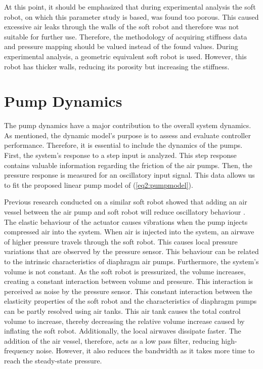 At this point, it should be emphasized that during experimental analysis the soft robot, on which this parameter study is based, was found too porous. This caused excessive air leaks through the walls of the soft robot and therefore was not suitable for further use. Therefore, the methodology of acquiring stiffness data and pressure mapping should be valued instead of the found values. During experimental analysis, a geometric equivalent soft robot is used. However, this robot has thicker walls, reducing its porosity but increasing the stiffness. 




\section{Pump Dynamics}



The pump dynamics have a major contribution to the overall system dynamics. As mentioned, the dynamic model's purpose is to assess and evaluate controller performance. Therefore, it is essential to include the dynamics of the pumps. First, the system's response to a step input is analyzed. This step response contains valuable information regarding the friction of the air pumps. Then, the pressure response is measured for an oscillatory input signal. This data allows us to fit the proposed linear pump model of (\ref{eq2:pumpmodel}).


Previous research conducted on a similar soft robot showed that adding an air vessel between the air pump and soft robot will reduce oscillatory behaviour \cite{proper}. The elastic behaviour of the actuator causes vibrations when the pump injects compressed air into the system. When air is injected into the system, an airwave of higher pressure travels through the soft robot. This causes local pressure variations that are observed by the pressure sensor. This behaviour can be related to the intrinsic characteristics of diaphragm air pumps. Furthermore, the system's volume is not constant. As the soft robot is pressurized, the volume increases, creating a constant interaction between volume and pressure. This interaction is perceived as noise by the pressure sensor. This constant interaction between the elasticity properties of the soft robot and the characteristics of diaphragm pumps can be partly resolved using air tanks. This air tank causes the total control volume to increase, thereby decreasing the relative volume increase caused by inflating the soft robot. Additionally, the local airwaves dissipate faster. The addition of the air vessel, therefore, acts as a low pass filter, reducing high-frequency noise. However, it also reduces the bandwidth as it takes more time to reach the steady-state pressure.

